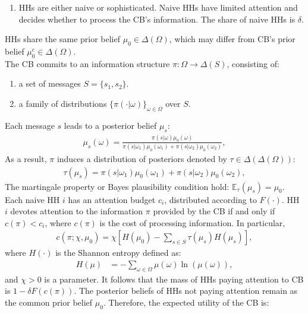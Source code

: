 \documentclass{beamer}
\begin{document}
\begin{frame}[allowframebreaks]
\begin{enumerate}
    \item HHs are either naive or sophisticated. Naive HHs have limited attention and decides whether to process the CB's information. The share of naive HHs is $\delta$.
\end{enumerate}
HHs share the same prior belief $\mu_0 \in \Delta(\Omega)$, which may differ from CB's prior belief $\mu_0^c \in \Delta(\Omega)$.\\
\framebreak
The CB commits to an information structure $\pi: \Omega \to \Delta(S)$, consisting of:
\begin{enumerate}
    \item a set of messages $S=\{s_1,s_2\}$.
    \item a family of distributions $\{\pi(\cdot|\omega)\}_{\omega\in\Omega}$ over $S$.
\end{enumerate}
Each message $s$ leads to a posterior belief $\mu_s$:
\begin{align*}
    \mu_s(\omega) = \frac{\pi(s|\omega)\mu_0(\omega)}{\pi(s|\omega_1)\mu_0(\omega_1)+\pi(s|\omega_2)\mu_0(\omega_2)},
\end{align*}
As a result, $\pi$ induces a distribution of posteriors denoted by $\tau \in \Delta(\Delta(\Omega))$:
\begin{align*}
    \tau(\mu_s) = \pi(s|\omega_1)\mu_0(\omega_1)+\pi(s|\omega_2)\mu_0(\omega_2),
\end{align*}
The martingale property or Bayes plausibility condition hold: $\mathbb{E}_{\tau}(\mu_s)=\mu_0$.
\vskip5pt 
\framebreak
Each naive HH $i$ has an attention budget $c_i$, distributed according to $F(\cdot)$. 
\vskip5pt HH $i$ devotes attention to the information $\pi$ provided by the CB if and only if $c(\pi)<c_i$, where $c(\pi)$ is the cost of processing information. In particular,
\begin{align*}
    c(\pi; \chi, \mu_0) = \chi\left[H(\mu_0)-\sum_{s \in S}\tau(\mu_s) H(\mu_s)\right],
\end{align*}
where $H(\cdot)$ is the Shannon entropy defined as:
\begin{align*}
    H(\mu) & = -\sum_{\omega\in\Omega}\mu(\omega)\ln(\mu(\omega)),
\end{align*}
and $\chi>0$ is a parameter. 
\vskip5pt 
\framebreak
It follows that the mass of HHs paying attention to CB is $1-\delta F(c(\pi))$. 
\vskip5pt 
The posterior beliefs of HHs not paying attention remain as the common prior belief $\mu_0$. 
\vskip5pt 
Therefore, the expected utility of the CB is:
\begin{equation}
\label{expected_uc}

\end{equation}
\end{frame}
\end{document}
